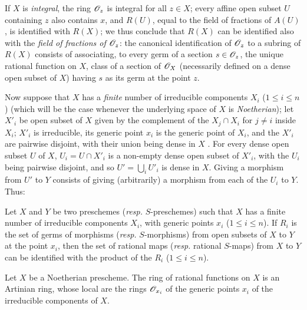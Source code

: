 If $X$ is \emph{integral}, the ring $\mathscr{O}_z$ is integral for all $z\in X$; every affine open subset $U$ containing $z$ also contains $x$, and $R(U)$, equal to the field of fractions of $A(U)$, is identified with $R(X)$; we thus conclude that $R(X)$ can be identified also with the \emph{field of fractions of $\mathscr{O}_z$}: the canonical identification of $\mathscr{O}_z$ to a subring of $R(X)$ consists of associating, to every germ of a section $s\in\mathscr{O}_z$, the unique rational function on $X$,  class of a section of $\mathscr{O}_X$ (necessarily defined on a dense open subset of $X$) having $s$ as its germ at the point $z$.

\begin{env}[7.1.6]
\label{1.7.1.6}
Now suppose that $X$ has a \emph{finite} number of irreducible components $X_i$ ($1\leqslant i\leqslant n$) (which will be the case whenever the underlying space of $X$ is \emph{Noetherian}); let $X'_i$ be open subset of $X$ given by the complement of the $X_j\cap X_i$ for $j\neq i$ inside $X_i$; $X'_i$ is irreducible, its generic point $x_i$ is the generic point of $X_i$, and the $X'_i$ are pairwise disjoint, with their union being dense in $X$ .
For every dense open subset $U$ of $X$, $U_i=U\cap X'_i$ is a non-empty dense open subset of $X'_i$, with the $U_i$ being pairwise disjoint, and so $U'=\bigcup_i U'_i$ is dense in $X$.
Giving a morphism from $U'$ to $Y$ consists of giving (arbitrarily) a morphism from each of the $U_i$ to $Y$.
Thus:
\end{env}

\begin{prop}[7.1.7]
\label{1.7.1.7}
Let $X$ and $Y$ be two preschemes (\emph{resp.} $S$-preschemes) such that $X$ has a finite number of irreducible components $X_i$, with generic points $x_i$ ($1\leqslant i\leqslant n$).
If $R_i$ is the set of germs of morphisms (\emph{resp.} $S$-morphisms) from open subsets of $X$ to $Y$ at the point $x_i$, then the set of rational maps (\emph{resp.} rational $S$-maps) from $X$ to $Y$ can be identified with the product of the $R_i$ ($1\leqslant i\leqslant n$).
\end{prop}

\begin{cor}[7.1.8]
\label{1.7.1.8}
Let $X$ be a Noetherian prescheme.
The ring of rational functions on $X$ is an Artinian ring, whose local  are the rings $\mathscr{O}_{x_i}$ of the generic points $x_i$ of the irreducible components of $X$.
\end{cor}

